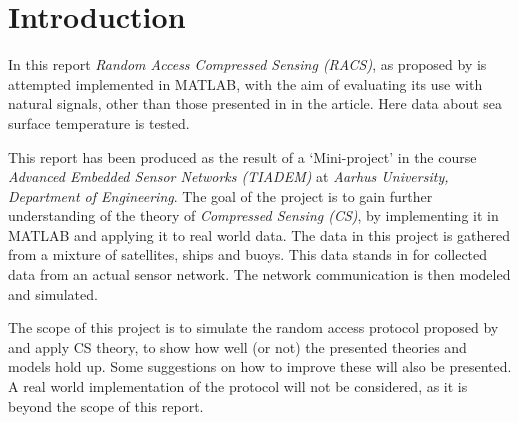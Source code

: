 \documentclass[Main]{subfiles}
\begin{document}
\section{Introduction} %
\label{sec:introduction}
	In this report \emph{Random Access Compressed Sensing (RACS)}, as proposed by \cite{Fazel2011} is attempted implemented in MATLAB, with the aim of evaluating its use with natural signals, other than those presented in in the article.
	Here data about sea surface temperature is tested.

	This report has been produced as the result of a `Mini-project' in the course \emph{Advanced Embedded Sensor Networks (TIADEM)} at \emph{Aarhus University, Department of Engineering}.
	The goal of the project is to gain further understanding of the theory of \emph{Compressed Sensing (CS)}, by implementing it in MATLAB and applying it to real world data.
	The data in this project is gathered from a mixture of satellites, ships and buoys.
	This data stands in for collected data from an actual sensor network.
	The network communication is then modeled and simulated.

	The scope of this project is to simulate the random access protocol proposed by \cite{Fazel2011} and apply CS theory, to show how well (or not) the presented theories and models hold up.
	Some suggestions on how to improve these will also be presented.
	A real world implementation of the protocol will not be considered, as it is beyond the scope of this report.

\end{document}
